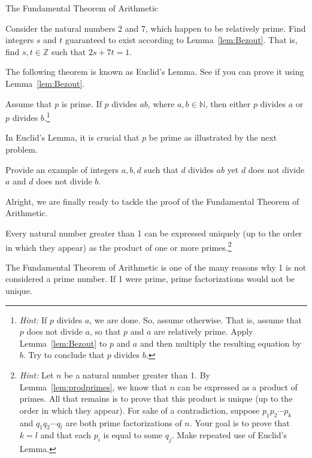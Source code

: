 \begin{section}{The Fundamental Theorem of Arithmetic}
\begin{exercise}
Consider the natural numbers 2 and 7, which happen to be relatively prime.  Find integers $s$ and $t$ guaranteed to exist according to Lemma~\ref{lem:Bezout}.  That is, find $s,t\in\mathbb{Z}$ such that $2s+7t=1$.
\end{exercise}

The following theorem is known as Euclid's Lemma. See if you can prove it using Lemma~\ref{lem:Bezout}.

\begin{theorem}\label{thm:Euclid}
Assume that $p$ is prime.  If $p$ divides $ab$, where $a,b\in\mathbb{N}$, then either $p$ divides $a$ or $p$ divides $b$.\footnote{\emph{Hint:} If $p$ divides $a$, we are done.  So, assume otherwise.  That is, assume that $p$ does not divide $a$, so that $p$ and $a$ are relatively prime.  Apply Lemma~\ref{lem:Bezout} to $p$ and $a$ and then multiply the resulting equation by $b$. Try to conclude that $p$ divides $b$.}
\end{theorem}

In Euclid's Lemma, it is crucial that $p$ be prime as illustrated by the next problem.

\begin{problem}
Provide an example of integers $a, b, d$ such that $d$ divides $ab$ yet $d$ does not divide $a$ and $d$ does not divide $b$.
\end{problem}

Alright, we are finally ready to tackle the proof of the Fundamental Theorem of Arithmetic.

\begin{theorem}\label{thm:FTA}
Every natural number greater than 1 can be expressed uniquely (up to the order in which they appear) as the product of one or more primes.\footnote{\emph{Hint:} Let $n$ be a natural number greater than 1. By Lemma~\ref{lem:prodprimes}, we know that $n$ can be expressed as a product of primes.  All that remains is to prove that this product is unique (up to the order in which they appear). For sake of a contradiction, suppose $p_1 p_2 \cdots p_k$ and $q_1 q_2 \cdots q_l$ are both prime factorizations of $n$.  Your goal is to prove that $k=l$ and that each $p_i$ is equal to some $q_j$. Make repeated use of Euclid's Lemma.}
\end{theorem}

The Fundamental Theorem of Arithmetic is one of the many reasons why 1 is not considered a prime number. If 1 were prime, prime factorizations would not be unique.

\end{section}